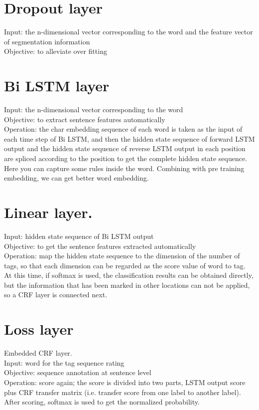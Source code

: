 \section{Dropout layer} \label{sec-conclusions}
Input: the n-dimensional vector corresponding to the word and the feature vector of segmentation information\\
Objective: to alleviate over fitting
\section{Bi LSTM layer} \label{sec-conclusions}
Input: the n-dimensional vector corresponding to the word\\
Objective: to extract sentence features automatically\\
Operation: the char embedding sequence of each word is taken as the input of each time step of Bi LSTM, and then the hidden state sequence of forward LSTM output and the hidden state sequence of reverse LSTM output in each position are spliced according to the position to get the complete hidden state sequence.
Here you can capture some rules inside the word. Combining with pre training embedding, we can get better word embedding.
\section{Linear layer.} \label{sec-conclusions}
Input: hidden state sequence of Bi LSTM output\\
Objective: to get the sentence features extracted automatically\\
Operation: map the hidden state sequence to the dimension of the number of tags, so that each dimension can be regarded as the score value of word to tag. At this time, if softmax is used, the classification results can be obtained directly, but the information that has been marked in other locations can not be applied, so a CRF layer is connected next.
\section{Loss layer} \label{sec-conclusions}
Embedded CRF layer.\\
Input: word for the tag sequence rating\\
Objective: sequence annotation at sentence level\\
Operation: score again; the score is divided into two parts, LSTM output score plus CRF transfer matrix (i.e. transfer score from one label to another label). After scoring, softmax is used to get the normalized probability.

